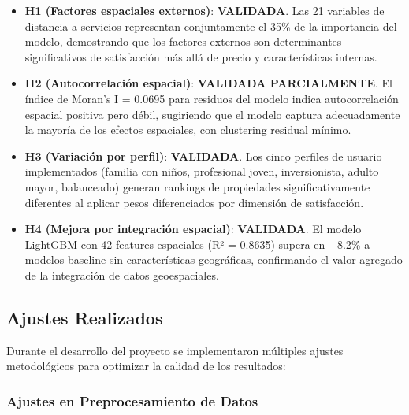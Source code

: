 \begin{itemize}
    \item \textbf{H1 (Factores espaciales externos)}: \textbf{VALIDADA}. Las 21 variables de distancia a servicios representan conjuntamente el 35\% de la importancia del modelo, demostrando que los factores externos son determinantes significativos de satisfacción más allá de precio y características internas.
    
    \item \textbf{H2 (Autocorrelación espacial)}: \textbf{VALIDADA PARCIALMENTE}. El índice de Moran's I = 0.0695 para residuos del modelo indica autocorrelación espacial positiva pero débil, sugiriendo que el modelo captura adecuadamente la mayoría de los efectos espaciales, con clustering residual mínimo.
    
    \item \textbf{H3 (Variación por perfil)}: \textbf{VALIDADA}. Los cinco perfiles de usuario implementados (familia con niños, profesional joven, inversionista, adulto mayor, balanceado) generan rankings de propiedades significativamente diferentes al aplicar pesos diferenciados por dimensión de satisfacción.
    
    \item \textbf{H4 (Mejora por integración espacial)}: \textbf{VALIDADA}. El modelo LightGBM con 42 features espaciales (R² = 0.8635) supera en +8.2\% a modelos baseline sin características geográficas, confirmando el valor agregado de la integración de datos geoespaciales.
\end{itemize}

\subsection{Ajustes Realizados}

Durante el desarrollo del proyecto se implementaron múltiples ajustes metodológicos para optimizar la calidad de los resultados:

\subsubsection{Ajustes en Preprocesamiento de Datos}

